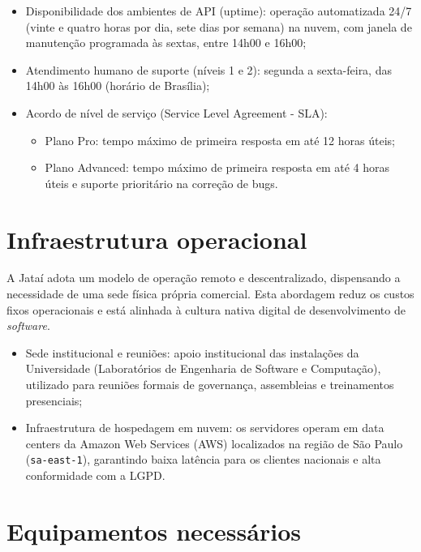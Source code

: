 \documentclass[
  12pt,
  openright,
  oneside,
  a4paper,
  brazilian
]{abntex2}
\begin{document}
\begin{itemize}
    \item{Disponibilidade dos ambientes de API (uptime):} operação automatizada 24/7 (vinte e quatro horas por dia, sete dias por semana) na nuvem, com janela de manutenção programada às sextas, entre 14h00 e 16h00;
    \item{Atendimento humano de suporte (níveis 1 e 2):} segunda a sexta-feira, das 14h00 às 16h00 (horário de Brasília);
    \item{Acordo de nível de serviço (Service Level Agreement - SLA):}
    \begin{itemize}
        \item{Plano Pro:} tempo máximo de primeira resposta em até 12 horas úteis;
        \item{Plano Advanced:} tempo máximo de primeira resposta em até 4 horas úteis e suporte prioritário na correção de bugs.
    \end{itemize}
\end{itemize}

\section{Infraestrutura operacional}
\label{sec:localizacao_infraestrutura}

A Jataí adota um modelo de operação remoto e descentralizado, dispensando a necessidade de uma sede física própria comercial. Esta abordagem reduz os custos fixos operacionais e está alinhada à cultura nativa digital de desenvolvimento de \textit{software}.

\begin{itemize}
    \item{Sede institucional e reuniões:} apoio institucional das instalações da Universidade (Laboratórios de Engenharia de Software e Computação), utilizado para reuniões formais de governança, assembleias e treinamentos presenciais;
    \item{Infraestrutura de hospedagem em nuvem:} os servidores operam em data centers da Amazon Web Services (AWS) localizados na região de São Paulo (\texttt{sa-east-1}), garantindo baixa latência para os clientes nacionais e alta conformidade com a LGPD.
\end{itemize}

\section{Equipamentos necessários}
\label{sec:equipamentos_necessarios}
\end{document}
